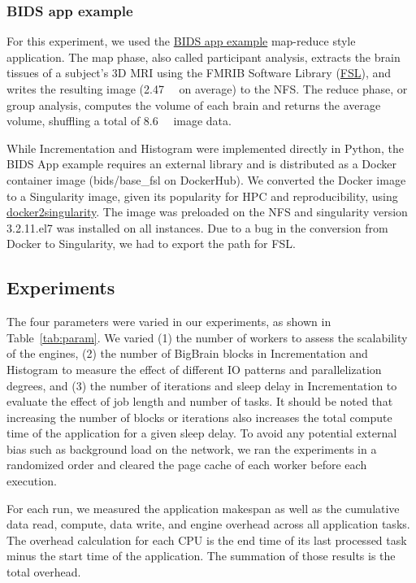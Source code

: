 \documentclass[conference]{IEEEtran}
\begin{document}
\subsubsection{BIDS app example}

For this experiment, we used the
\href{https://github.com/BIDS-Apps/example}{BIDS app example} map-reduce style 
application. The map phase, also called participant analysis, extracts the brain
tissues of a subject's 3D MRI using the FMRIB Software Library
(\href{https://fsl.fmrib.ox.ac.uk/fsl/fslwiki}{FSL}), and writes the resulting
image (\SI{2.47}{\mega\byte} on average) to the NFS. The reduce phase, or group
analysis, computes the volume of each brain and returns the average
volume, shuffling a total of \SI{8.6}{\giga\byte} image data.

While Incrementation and Histogram were implemented directly in Python, the 
BIDS App example requires an external library and is distributed as a Docker container image
(bids/base\_fsl on DockerHub). We converted the Docker image to a Singularity image,
given its popularity for HPC and reproducibility, using
\href{https://hub.docker.com/r/singularityware/docker2singularity/tags/}{docker2singularity}.
The image was preloaded on the NFS and singularity version 3.2.1\-1.el7 was installed
on all instances. Due to a bug in the conversion from Docker to Singularity, we had to
export the path for FSL.

\subsection{Experiments}

The four parameters were varied in our experiments, as shown in
Table~\ref{tab:param}. We varied (1) the number of workers to assess the
scalability of the engines, (2) the number of BigBrain blocks in
Incrementation and Histogram to measure the effect of different IO patterns
and parallelization degrees, and (3) the number of iterations and sleep
delay in Incrementation to evaluate the effect of job length and number of
tasks.
It should be noted that increasing the number of blocks or iterations also
increases the total compute time of the application for a given sleep
delay. To avoid any potential external bias such as background load on the
network, we ran the experiments in a randomized order and cleared the page
cache of each worker before each execution.

For each run, we measured the application makespan as well as the cumulative 
data read, compute, data write, and engine overhead across all application
tasks. 
The overhead calculation for each CPU is the end time of its last processed task
minus the start time of the application. The summation of those results is the
total overhead.
\end{document}
